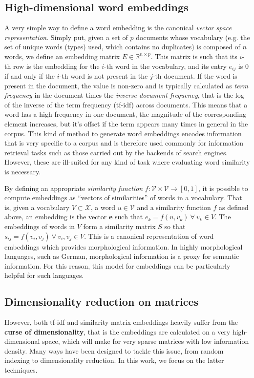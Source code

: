 \subsection{High-dimensional word embeddings}
A very simple way to define a word embedding is the canonical \emph{vector space representation}.
Simply put, given a set of $p$ documents whose vocabulary (e.g. the set of unique words (types) used, which contains no duplicates) is composed of $n$ words, we define an embedding matrix $E \in \mathbb{R}^{n\times p}$. This matrix is such that its $i$-th row is the embedding for the $i$-th word in the vocabulary, and its entry $e_{ij}$ is 0 if and only if the $i$-th word is not present in the $j$-th document. 
If the word is present in the document, the value is non-zero and is typically calculated as \emph{term frequency} in the document times the \emph{inverse document frequency}\cite{luhn_statistical_1957}, that is the log of the inverse of the term frequency (tf-idf) across documents.
This means that a word has a high frequency in one document, the magnitude of the corresponding element increases, but it's offset if the term appears many times in general in the corpus.
This kind of method to generate word embeddings encodes information that is very specific to a corpus and is therefore used commonly for information retrieval tasks such as those carried out by the backends of search engines.
However, these are ill-suited for any kind of task where evaluating word similarity is necessary. 

By defining an appropriate \textit{similarity function} $f: \mathcal{V} \times \mathcal{V} \rightarrow [0, 1]$, it is possible to compute embeddings as ``vectors of similarities'' of words in a vocabulary.
That is, given a vocabulary $V \subset \mathcal{X}$, a word $u \in \mathcal{V}$ and a similarity function $f$ as defined above, an embedding is the vector $\mathbf{e}$ such that $e_k = f(u, v_k) \: \forall \: v_k \in V$.
The embeddings of words in $V$ form a similarity matrix $S$ so that $s_{ij} = f(v_i, v_j) \: \forall \: v_i, v_j \in V$.
This is a canonical representation of word embeddings which provides morphological information. 
In highly morphological languages, such as German, morphological information is a proxy for semantic information.
For this reason, this model for embeddings can be particularly helpful for such languages.
\subsection{Dimensionality reduction on matrices}
However, both tf-idf and similarity matrix embeddings heavily suffer from the \textbf{curse of dimensionality}, that is the embeddings are calculated on a very high-dimensional space, which will make for very sparse matrices with low information density.
Many ways have been designed to tackle this issue, from random indexing \cite{karlgren_words_2001} to dimensionality reduction.
In this work, we focus on the latter techniques.

